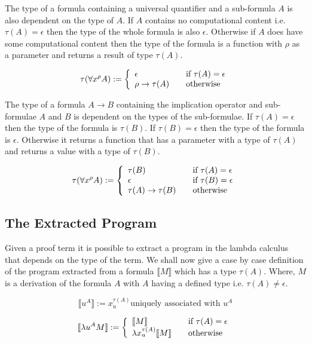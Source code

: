 The type of a formula containing a universal quantifier and a sub-formula $A$
is also dependent on the type of $A$. If $A$ contains no computational content
i.e. $\tau (A) = \epsilon$ then the type of the whole formula is also
$\epsilon$. Otherwise if $A$ does have some computational content then the type
of the formula is a function with $\rho$ as a parameter and returns a result
of type $\tau (A)$.


\[
\tau(\forall x^{\rho} A) := \left\{ 
\begin{array}{l l}
  \epsilon & \quad \text{if $\tau(A) = \epsilon$}\\
 \rho \to \tau (A) & \quad \text{otherwise}\\
\end{array} \right.
\]


The type of a formula $A \to B$ containing the implication operator and
sub-formulae $A$ and $B$ is dependent on the types of the sub-formulae.
If $\tau (A) = \epsilon$ then the type of the formula is $ \tau (B)$. If $\tau
(B) = \epsilon$ then the type of the formula is $\epsilon$. Otherwise it
returns a function that has a parameter with a type of $\tau (A)$ and returns a value with
a type of $\tau (B)$.

\[
\tau(\forall x^{\rho} A) := \left\{ 
\begin{array}{l l}
  \tau (B) & \quad \text{if $\tau (A) = \epsilon$}\\
  \epsilon & \quad \text{if $\tau (B) = \epsilon$}\\
  \tau (A) \to \tau (B) & \quad \text{otherwise}\\
\end{array} \right.
\]

\subsection*{The Extracted Program}
Given a proof term it is possible to extract a program in the lambda calculus  that depends on the type of the term. We shall now give a case by case definition of the program extracted from a formula $\llbracket M \rrbracket$ which has a type $\tau (A)$. Where, $M$ is a derivation of the formula $A$ with $A$ having a defined type i.e. $ \tau (A) \neq \epsilon $.

\[ \llbracket u^A \rrbracket := x^{\tau (A)}_{u} \text{uniquely associated with $u^A$}
\]

\[
\llbracket \lambda u^A M \rrbracket := \left\{ 
\begin{array}{l l}
\llbracket M \rrbracket  & \quad \text{if $\tau (A) = \epsilon$} \\ 
\lambda x^{\tau (A)}_{u} \llbracket M \rrbracket & \quad \text{otherwise} \\

\end{array} \right.
 \]

